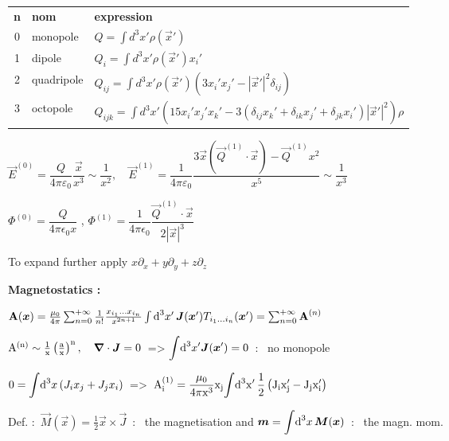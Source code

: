 \begin{squishlist}
\item \begin{tabular}{c | l l}
	\textbf{n} & \textbf{nom} & \textbf{expression} \\
	0 & monopole & $Q = \int d^3x' \rho (\vec{x}')$ \\
	1 & dipole & $Q_i = \int d^3x' \rho (\vec{x}') x_i'$ \\
	2 & quadripole & $Q_{ij} = \int d^3x' \rho (\vec{x}') (3x_i'x_j' - |\vec{x}'|^2\delta_{ij})$ \\
	3 & octopole & $Q_{ijk} = \int d^3x' (15x_i'x_j'x_k' -3(\delta_{ij}x_k' + \delta_{ik}x_j'+\delta_{jk}x_i') |\vec{x}'|^2)\rho$
\end{tabular}

\item $\vec{E}^{(0)} = \dfrac{Q}{4\pi\varepsilon_0} \dfrac{\vec{x}}{x^3} \sim \dfrac{1}{x^2} ,\quad \vec{E}^{(1)} = \dfrac{1}{4\pi\varepsilon_0}\dfrac{3\vec{x}(\vec{Q}^{(1)}\cdot\vec{x}) - \vec{Q}^{(1)}x^2}{x^5} \sim \dfrac{1}{x^3}$

\item $\Phi^{(0)} = \dfrac{Q}{4 \pi \epsilon_0 x} $ , \qquad $\Phi^{(1)} = \dfrac{1}{4\pi \epsilon_0}\dfrac{\vec{Q}^{(1)}\cdot \vec{x}}{2 |\vec{x}|^3}$ 

\item To expand further apply $x \partial_{x} + y \partial_{y} + z \partial_{z}$

\item \textbf{Magnetostatics :}

\item $\vec{\rm{A}}(\vec{x}) = \frac{\mu_0}{4\pi} \sum_{n=0}^{+\infty} \frac{1}{n!} \frac{x_{i_1}...x_{i_n}}{x^{2n+1}} \int \ud ^3x' \, \vec{J}(\vec{x}') T_{i_1...i_n}(\vec{x}') = \sum_{n=0}^{+\infty} \vec{\rm{A}}^{(n)}$

\item $\rm{A}^{(n)} \sim \frac{1}{x} \left( \frac{a}{x} \right)^n, \quad \vec{\nabla}\cdot\vec{J} = 0 \, $ => $ \displaystyle{\int} \ud ^3x' \vec{J}(\vec{x}') = 0 \,$ : \, no monopole

\item $0 = \displaystyle{\int} \ud ^3x \, (J_i x_j + J_j x_i) \,$ => $\, \rm{A}^{(1)}_i = \dfrac{\mu_0}{4\pi x^3} x_j \displaystyle{\int} \ud ^3x' \, \frac{1}{2}\left(J_ix'_j - J_j x'_i \right)$

\item  Def. : $\, \vec{M}(\vec{x}) = \frac{1}{2} \vec{x}\times\vec{J} \,$ : \, the magnetisation and  $\vec{m} = \displaystyle{\int} \ud ^3x \, \vec{M}(\vec{x}) \, $ : \, the magn. mom.


\end{squishlist}
